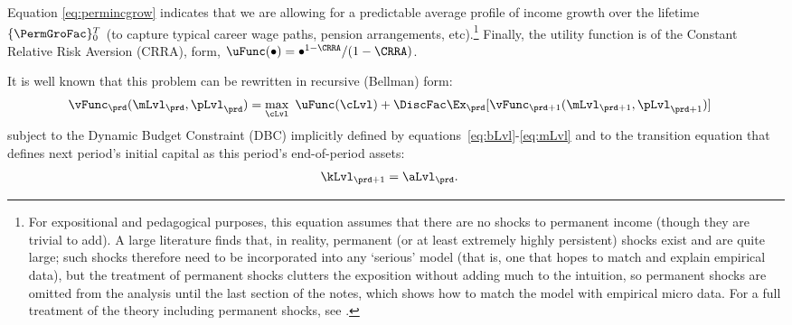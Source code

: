 Equation \eqref{eq:permincgrow} indicates that we are allowing for a predictable average profile of income growth over the lifetime $\{\PermGroFac\}_{0}^{T}$ (to capture typical career wage paths, pension arrangements, etc).\footnote{For expositional and pedagogical purposes, this equation assumes that there are no shocks to permanent income (though they are trivial to add).  A large literature finds that, in reality, permanent (or at least extremely highly persistent) shocks exist and are quite large; such shocks therefore need to be incorporated into any `serious' model (that is, one that hopes to match and explain empirical data), but the treatment of permanent shocks clutters the exposition without adding much to the intuition, so permanent shocks are omitted from the analysis until the last section of the notes, which shows how to match the model with empirical micro data.  For a full treatment of the theory including permanent shocks, see \cite{BufferStockTheory}.}  Finally, the utility function is of the Constant Relative Risk Aversion (CRRA), form, $\uFunc(\bullet) = \bullet^{1-\CRRA}/(1-\CRRA)$.

It is well known that this problem can be rewritten in recursive (Bellman) form:
  \begin{equation}\begin{gathered}\begin{aligned}
        \vFunc_{\prd}(\mLvl_{\prd},\pLvl_{\prd})  & = \max_{\cLvl}~ \uFunc(\cLvl) + \DiscFac \Ex_{\prd}[ \vFunc_{\prd+1}(\mLvl_{\prd+1},\pLvl_{\prd+1})]\label{eq:vrecurse}
      \end{aligned}\end{gathered}\end{equation}
subject to the Dynamic Budget Constraint (DBC) implicitly defined by equations~\eqref{eq:bLvl}-\eqref{eq:mLvl} and to the transition equation that defines next period's initial capital as this period's end-of-period assets:
\begin{equation}\begin{gathered}\begin{aligned}
      \kLvl_{\prd+1} & = \aLvl_{\prd}. \label{eq:transitionstate}
    \end{aligned}\end{gathered}\end{equation}

